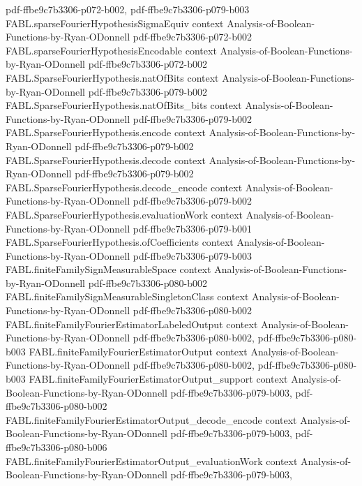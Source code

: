 \begin{theorem}
  {pdf-ffbe9c7b3306-p072-b002,
    pdf-ffbe9c7b3306-p079-b003}
\proofstep
  {FABL.sparseFourierHypothesisSigmaEquiv}
  {context}
  {Analysis-of-Boolean-Functions-by-Ryan-ODonnell}
  {pdf-ffbe9c7b3306-p072-b002}
\proofstep
  {FABL.sparseFourierHypothesisEncodable}
  {context}
  {Analysis-of-Boolean-Functions-by-Ryan-ODonnell}
  {pdf-ffbe9c7b3306-p072-b002}
\proofstep
  {FABL.SparseFourierHypothesis.natOfBits}
  {context}
  {Analysis-of-Boolean-Functions-by-Ryan-ODonnell}
  {pdf-ffbe9c7b3306-p079-b002}
\proofstep
  {FABL.SparseFourierHypothesis.natOfBits_bits}
  {context}
  {Analysis-of-Boolean-Functions-by-Ryan-ODonnell}
  {pdf-ffbe9c7b3306-p079-b002}
\proofstep
  {FABL.SparseFourierHypothesis.encode}
  {context}
  {Analysis-of-Boolean-Functions-by-Ryan-ODonnell}
  {pdf-ffbe9c7b3306-p079-b002}
\proofstep
  {FABL.SparseFourierHypothesis.decode}
  {context}
  {Analysis-of-Boolean-Functions-by-Ryan-ODonnell}
  {pdf-ffbe9c7b3306-p079-b002}
\proofstep
  {FABL.SparseFourierHypothesis.decode_encode}
  {context}
  {Analysis-of-Boolean-Functions-by-Ryan-ODonnell}
  {pdf-ffbe9c7b3306-p079-b002}
\proofstep
  {FABL.SparseFourierHypothesis.evaluationWork}
  {context}
  {Analysis-of-Boolean-Functions-by-Ryan-ODonnell}
  {pdf-ffbe9c7b3306-p079-b001}
\proofstep
  {FABL.SparseFourierHypothesis.ofCoefficients}
  {context}
  {Analysis-of-Boolean-Functions-by-Ryan-ODonnell}
  {pdf-ffbe9c7b3306-p079-b003}
\proofstep
  {FABL.finiteFamilySignMeasurableSpace}
  {context}
  {Analysis-of-Boolean-Functions-by-Ryan-ODonnell}
  {pdf-ffbe9c7b3306-p080-b002}
\proofstep
  {FABL.finiteFamilySignMeasurableSingletonClass}
  {context}
  {Analysis-of-Boolean-Functions-by-Ryan-ODonnell}
  {pdf-ffbe9c7b3306-p080-b002}
\proofstep
  {FABL.finiteFamilyFourierEstimatorLabeledOutput}
  {context}
  {Analysis-of-Boolean-Functions-by-Ryan-ODonnell}
  {pdf-ffbe9c7b3306-p080-b002,
    pdf-ffbe9c7b3306-p080-b003}
\proofstep
  {FABL.finiteFamilyFourierEstimatorOutput}
  {context}
  {Analysis-of-Boolean-Functions-by-Ryan-ODonnell}
  {pdf-ffbe9c7b3306-p080-b002,
    pdf-ffbe9c7b3306-p080-b003}
\proofstep
  {FABL.finiteFamilyFourierEstimatorOutput_support}
  {context}
  {Analysis-of-Boolean-Functions-by-Ryan-ODonnell}
  {pdf-ffbe9c7b3306-p079-b003,
    pdf-ffbe9c7b3306-p080-b002}
\proofstep
  {FABL.finiteFamilyFourierEstimatorOutput_decode_encode}
  {context}
  {Analysis-of-Boolean-Functions-by-Ryan-ODonnell}
  {pdf-ffbe9c7b3306-p079-b003,
    pdf-ffbe9c7b3306-p080-b006}
\proofstep
  {FABL.finiteFamilyFourierEstimatorOutput_evaluationWork}
  {context}
  {Analysis-of-Boolean-Functions-by-Ryan-ODonnell}
  {pdf-ffbe9c7b3306-p079-b003,
}
\end{theorem}
